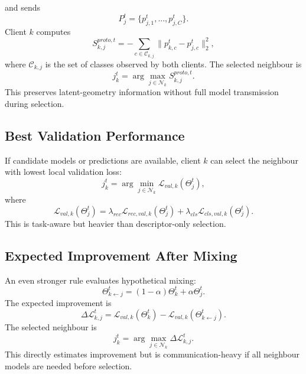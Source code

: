 \documentclass[conference]{IEEEtran}
\begin{document}
and sends
\begin{equation*}
    P_j^t = \{p_{j,1}^{t},\dots,p_{j,C}^{t}\}.
\end{equation*}
Client \(k\) computes
\begin{equation}
    S_{k,j}^{proto,t}
    =
    -\sum_{c\in\mathcal{C}_{k,j}}
    \|p_{k,c}^{t}-p_{j,c}^{t}\|_2^2,
    \label{eq:proto_alignment}
\end{equation}
where \(\mathcal{C}_{k,j}\) is the set of classes observed by both clients. The selected neighbour is
\begin{equation*}
    j_k^t = \arg\max_{j\in\mathcal{N}_k} S_{k,j}^{proto,t}.
\end{equation*}
This preserves latent-geometry information without full model transmission during selection.

\subsection{Best Validation Performance}
\label{subsec:best-validation-performance}
If candidate models or predictions are available, client \(k\) can select the neighbour with lowest local validation loss:
\begin{equation*}
    j_k^t
    =
    \arg\min_{j\in\mathcal{N}_k}
    \mathcal{L}_{val,k}(\Theta_j^t),
\end{equation*}
where
\begin{equation*}
\mathcal{L}_{val,k}(\Theta_j^t)
=
\lambda_{rec}\mathcal{L}_{rec,val,k}(\Theta_j^t)
+
\lambda_{cls}\mathcal{L}_{cls,val,k}(\Theta_j^t).
\end{equation*}
This is task-aware but heavier than descriptor-only selection.

\subsection{Expected Improvement After Mixing}
\label{subsec:expected-improvement-after-mixing}
An even stronger rule evaluates hypothetical mixing:
\begin{equation*}
    \Theta_{k\leftarrow j}^{t}
    =
    (1-\alpha)\Theta_k^t + \alpha\Theta_j^t.
\end{equation*}
The expected improvement is
\begin{equation*}
    \Delta\mathcal{L}_{k,j}^{t}
    =
    \mathcal{L}_{val,k}(\Theta_k^t)
    -
    \mathcal{L}_{val,k}(\Theta_{k\leftarrow j}^{t}).
\end{equation*}
The selected neighbour is
\begin{equation*}
    j_k^t = \arg\max_{j\in\mathcal{N}_k} \Delta\mathcal{L}_{k,j}^{t}.
\end{equation*}
This directly estimates improvement but is communication-heavy if all neighbour models are needed before selection.
\end{document}
